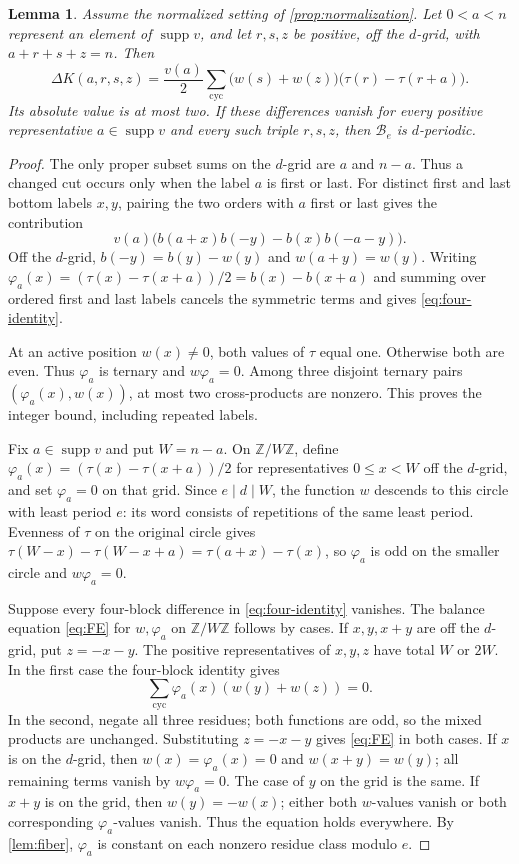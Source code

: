 \documentclass[11pt,a4paper]{amsart}
\numberwithin{equation}{section}
\theoremstyle{plain}
\newtheorem{lemma}[theorem]{Lemma}
\theoremstyle{definition}
\newcommand{\Z}{\mathbb Z}
\newcommand{\supp}{\operatorname{supp}}
\begin{document}
\begin{lemma}\label{lem:four-start}
Assume the normalized setting of \cref{prop:normalization}.  Let
\(0<a<n\) represent an element of \(\supp v\), and let \(r,s,z\) be positive,
off the \(d\)-grid, with
\(a+r+s+z=n\).  Then
\begin{equation}\label{eq:four-identity}
\Delta K(a,r,s,z)
=\frac{v(a)}2\sum_{\mathrm{cyc}}
\bigl(w(s)+w(z)\bigr)\bigl(\tau(r)-\tau(r+a)\bigr).
\end{equation}
Its absolute value is at most two.  If these differences vanish for every
positive representative \(a\in\supp v\) and every such triple \(r,s,z\),
then \(\mathcal B_e\) is \(d\)-periodic.
\end{lemma}
\begin{proof}
The only proper subset sums on the \(d\)-grid are \(a\) and \(n-a\).
Thus a changed cut occurs only when the label \(a\) is first or last.
For distinct first and last bottom labels \(x,y\), pairing the two orders
with \(a\) first or last gives the contribution
\[
v(a)\bigl(b(a+x)b(-y)-b(x)b(-a-y)\bigr).
\]
Off the \(d\)-grid, \(b(-y)=b(y)-w(y)\) and \(w(a+y)=w(y)\).
Writing \(\varphi_a(x)=(\tau(x)-\tau(x+a))/2=b(x)-b(x+a)\) and summing over
ordered first and last labels cancels the symmetric terms and gives
\eqref{eq:four-identity}.

At an active position \(w(x)\ne0\), both values of \(\tau\) equal one.
Otherwise both are even.  Thus \(\varphi_a\) is ternary and \(w\varphi_a=0\).
Among three disjoint ternary pairs \((\varphi_a(x),w(x))\), at most two cross-products
are nonzero.  This proves the integer bound, including repeated labels.

Fix \(a\in\supp v\) and put \(W=n-a\).  On \(\Z/W\Z\), define
\(\varphi_a(x)=(\tau(x)-\tau(x+a))/2\) for representatives \(0\le x<W\)
off the \(d\)-grid, and set \(\varphi_a=0\) on that grid.  Since
\(e\mid d\mid W\), the function \(w\) descends to this circle with
least period \(e\): its word consists of repetitions of the same least
period.  Evenness of \(\tau\) on the original circle gives
\(\tau(W-x)-\tau(W-x+a)=\tau(a+x)-\tau(x)\),
so \(\varphi_a\) is odd on the smaller circle and \(w\varphi_a=0\).

Suppose every four-block difference in \eqref{eq:four-identity} vanishes.
The balance equation \eqref{eq:FE} for \(w,\varphi_a\) on \(\Z/W\Z\)
follows by cases.
If \(x,y,x+y\) are off the \(d\)-grid, put \(z=-x-y\).
The positive representatives of \(x,y,z\) have total \(W\) or \(2W\).
In the first case the four-block identity gives
\[
\sum_{\mathrm{cyc}} \varphi_a(x)(w(y)+w(z))=0.
\]
In the second, negate all three residues; both functions are odd, so the
mixed products are unchanged.  Substituting \(z=-x-y\) gives
\eqref{eq:FE} in both cases.  If \(x\) is on the \(d\)-grid,
then \(w(x)=\varphi_a(x)=0\) and \(w(x+y)=w(y)\); all remaining terms
vanish by \(w\varphi_a=0\).  The case of \(y\) on the grid is the same.
If \(x+y\) is on the grid, then \(w(y)=-w(x)\); either both
\(w\)-values vanish or both corresponding \(\varphi_a\)-values vanish.
Thus the equation holds everywhere.  By \cref{lem:fiber}, \(\varphi_a\)
is constant on each nonzero residue class modulo \(e\).


\end{proof}
\end{document}
